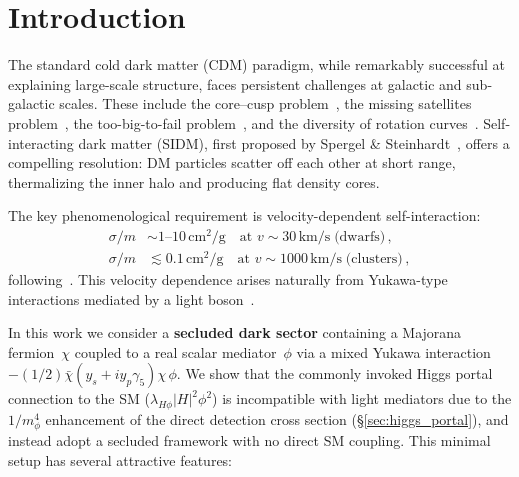 \documentclass[aps,prd,twocolumn,superscriptaddress,nofootinbib]{revtex4-2}
\newcommand{\sigmam}{\sigma/m}
\newcommand{\kms}{\,\text{km/s}}
\newcommand{\cmg}{\,\text{cm}^2/\text{g}}
\newcommand{\mphi}{m_\phi}
\begin{document}
\maketitle

\section{Introduction}\label{sec:intro}

The standard cold dark matter (CDM) paradigm, while remarkably
successful at explaining large-scale structure, faces persistent
challenges at galactic and sub-galactic scales.  These include the
core--cusp problem~\cite{deBlok:2009sp,Oh:2015xoa}, the missing
satellites problem~\cite{Klypin:1999uc}, the too-big-to-fail
problem~\cite{BoylanKolchin:2011de}, and the diversity of rotation
curves~\cite{Oman:2015xda}.  Self-interacting dark matter (SIDM),
first proposed by Spergel \& Steinhardt~\cite{Spergel:1999mh}, offers
a compelling resolution: DM particles scatter off each other at short
range, thermalizing the inner halo and producing flat density cores.

The key phenomenological requirement is velocity-dependent
self-interaction:
\begin{align}
  \sigmam &\sim 1\text{--}10\cmg \quad\text{at }v\sim 30\kms
    \;\text{(dwarfs)}\,,\\
  \sigmam &\lesssim 0.1\cmg \quad\text{at }v\sim 1000\kms
    \;\text{(clusters)}\,,
\end{align}
following~\cite{Clowe:2006eq,Robertson:2016xjh}.  This velocity
dependence arises naturally from Yukawa-type interactions mediated by a
light boson~\cite{Tulin:2013teo,Tulin:2017ara}.

In this work we consider a \textbf{secluded dark sector} containing a
Majorana fermion~$\chi$ coupled to a real scalar mediator~$\phi$ via a
mixed Yukawa interaction
$-(1/2)\bar\chi(y_s+iy_p\gamma_5)\chi\,\phi$.  We show that the
commonly invoked Higgs portal connection to the SM
($\lambda_{H\phi}|H|^{2}\phi^{2}$) is incompatible with light
mediators due to the $1/\mphi^{4}$ enhancement of the direct detection
cross section (\S\ref{sec:higgs_portal}), and instead adopt a secluded
framework with no direct SM coupling.  This minimal setup has several
attractive features:
\end{document}
